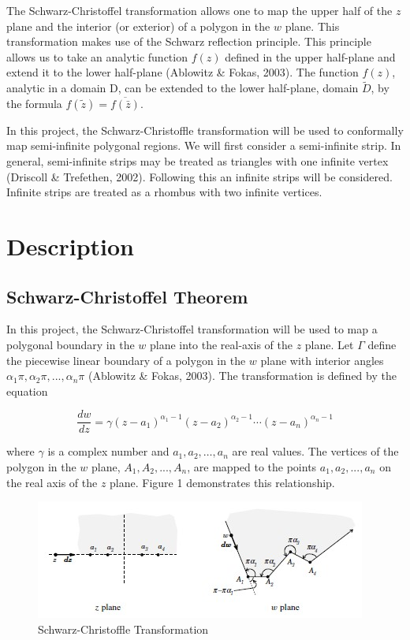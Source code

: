 \documentclass{article}
\begin{document}
The Schwarz-Christoffel transformation allows one to map the upper half of the $z$ plane and the interior (or exterior) of a polygon in the $w$ plane. This transformation makes use of the Schwarz reflection principle. This principle allows us to take an analytic function \(f(z)\) defined in the upper half-plane and extend it to the lower half-plane (Ablowitz \& Fokas, 2003). The function \(f(z)\), analytic in a domain D, can be extended to the lower half-plane, domain \(\tilde{D}\), by the formula \(f(\tilde{z}) = \overline{f(\bar{z})}\). 

In this project, the Schwarz-Christoffle transformation will be used to conformally map semi-infinite polygonal regions. We will first consider a semi-infinite strip. In general, semi-infinite strips may be treated as triangles with one infinite vertex (Driscoll \& Trefethen, 2002). Following this an infinite strips will be considered. Infinite strips are treated as a rhombus with two infinite vertices. 

\section{Description}
\subsection{Schwarz-Christoffel Theorem}
        In this project, the Schwarz-Christoffel transformation will be used to map a polygonal boundary in the $w$ plane into the real-axis of the $z$ plane. 
        Let \(\Gamma\)  define the piecewise linear boundary of a polygon in the $w$ plane with interior angles \(\alpha_{1}\pi,\alpha_{2}\pi,...,\alpha_{n}\pi\) (Ablowitz \& Fokas, 2003). The transformation is defined by the equation 
        
        \begin{equation}
            \frac{dw}{dz} = \gamma(z-a_{1})^{\alpha_{1} - 1}(z-a_{2})^{\alpha_{2} - 1}\cdots (z-a_{n})^{\alpha_{n}-1}
        \end{equation}
        
        where \(\gamma\) is a complex number and \(a_{1}, a_{2}, \ldots, a_{n}\) are real values. The vertices of the polygon in the $w$ plane, $A_{1}, A_{2}, ..., A_{n}$, are mapped to the points $a_{1}, a_{2}, ..., a_{n}$ on the real axis of the $z$ plane. Figure 1 demonstrates this relationship. 
        
        \begin{figure}
            \centering            
            \includegraphics[scale = 1.5 ]{Schwarz christoffle mapping.jpg}
            \caption{Schwarz-Christoffle Transformation}
            \label{fig:my_label}
        \end{figure}
        
\end{document}
